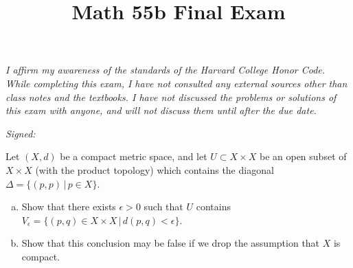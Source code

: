 \documentclass[11pt,letterpaper]{article}
\title{\textbf{Math 55b Final Exam}}
\begin{document}
\maketitle

\begin{center}
    \textit{I affirm my awareness of the standards of the Harvard College Honor Code. While completing this exam, I have not consulted any external sources other than class notes and the textbooks. I have not discussed the problems or solutions of this exam with anyone, and will not discuss them until after the due date.} 

    \textit{Signed: }
\end{center}

\begin{problem}
    Let $(X,d)$ be a compact metric space, and let $U\subset X\times X$ be an open subset of $X\times X$ (with the product topology) which contains the diagonal $\Delta=\{(p,p)\,|\,p\in X\}$.
    \begin{enumerate}[(a)]
        \item Show that there exists $\epsilon>0$ such that $U$ contains $V_\epsilon=\{(p,q)\in X\times X\,|\,d(p,q)<\epsilon\}$.
        \item Show that this conclusion may be false if we drop the assumption that $X$ is compact.
    \end{enumerate}
\end{problem}
\end{document}
